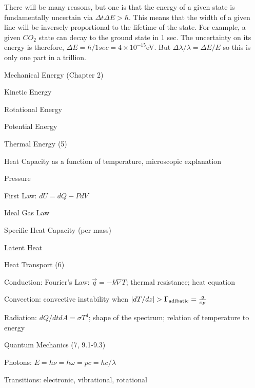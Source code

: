 \documentclass[11pt]{book}
\begin{document}
 There will be many reasons, but one is that the energy of a given state is fundamentally uncertain via $\Delta t\Delta E >\hbar$. This means that the width of a given line will be inversely proportional to the lifetime of the state. For example, a given $CO_2$ state can decay to the ground state in 1 sec. The uncertainty on its energy is therefore, $\Delta E = \hbar/1sec = 4\times 10^{-15}$eV. But $\Delta\lambda/\lambda = \Delta E/E$ so this is only one part in a trillion.





%
%


\bei 
\item Mechanical Energy (Chapter 2)
\bei
\item Kinetic Energy
\item Rotational Energy
\item Potential Energy
\eei
\item Thermal Energy (5)
\bei
\item Heat Capacity as a function of temperature, microscopic explanation
\item Pressure
\item First Law: $dU=dQ-PdV$
\item Ideal Gas Law
\item Specific Heat Capacity (per mass)
\item Latent Heat
\eei
\item Heat Transport (6)
\bei
\item Conduction: Fourier's Law: $\vec q = -k\nabla T$; thermal resistance; heat equation
\item Convection: convective instability when $\vert dT/dz\vert > \Gamma_{\rm adibatic} =\frac{g}{c_P}$
\item Radiation: $dQ/dt dA = \sigma T^4$; shape of the spectrum; relation of temperature to energy 
\eei
\item Quantum Mechanics (7, 9.1-9.3)
\bei
\item Photons: $E=h\nu=\hbar\omega=pc=hc/\lambda$
\item Transitions: electronic, vibrational, rotational
\eei
\eei
\end{document}
